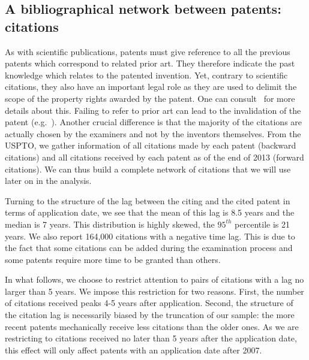 \documentclass[10pt,A4,draft]{article}
\begin{document}
\subsection{A bibliographical network between patents: citations \label{sub:citation}}

As with scientific publications, patents must give reference to all the previous patents which correspond to related prior art. They therefore indicate the past knowledge which relates to the patented invention. Yet, contrary to scientific citations, they also have an important legal role as they are used to delimit the scope of the property rights awarded by the patent. One can consult~\cite{oecdpatentmanual} for more details about this. Failing to refer to prior art can lead to the invalidation of the patent (e.g.~\cite{martin2015}). Another crucial difference is that the majority of the citations are actually chosen by the  examiners and not by the inventors themselves. 
From the USPTO, we gather information of all citations made by each patent (backward citations) and all citations received by each patent as of the end of 2013 (forward citations). We can thus build a complete network of citations that we will use later on in the analysis.

Turning to the structure of the lag between the citing and the cited patent in terms of application date, we see that the mean of this lag is 8.5 years and the median is 7 years. This distribution is highly skewed, the $95^{th}$ percentile is 21 years. We also report 164,000 citations with a negative time lag. This is due to the fact that some citations can be added during the examination process and some patents require more time to be granted than others.

In what follows, we choose to restrict attention to pairs of citations with a lag no larger than 5 years. We impose this restriction for two reasons. First, the number of citations received peaks 4-5 years after application. Second, the structure of the citation lag is necessarily biased by the truncation of our sample: the more recent patents mechanically receive less citations than the older ones. As we are restricting to citations received no later than 5 years after the application date, this effect will only affect patents with an application date after 2007.

\end{document}
